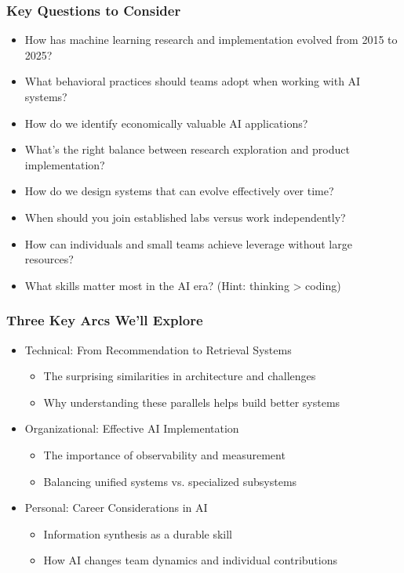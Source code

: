 {    \begin{frame}
        \frametitle{Key Questions to Consider}
        \begin{itemize}
            \item How has machine learning research and implementation evolved from 2015 to 2025?
            \item What behavioral practices should teams adopt when working with AI systems?
            \item How do we identify economically valuable AI applications?
            \item What's the right balance between research exploration and product implementation?
            \item How do we design systems that can evolve effectively over time?
            \item When should you join established labs versus work independently?
            \item How can individuals and small teams achieve leverage without large resources?
            \item What skills matter most in the AI era? (Hint: thinking > coding)
        \end{itemize}
    \end{frame}
    
    \begin{frame}
        \frametitle{Three Key Arcs We'll Explore}
        \begin{itemize}
            \item Technical: From Recommendation to Retrieval Systems
            \begin{itemize}
                \item The surprising similarities in architecture and challenges
                \item Why understanding these parallels helps build better systems
            \end{itemize}
            \item Organizational: Effective AI Implementation
            \begin{itemize}
                \item The importance of observability and measurement
                \item Balancing unified systems vs. specialized subsystems
            \end{itemize}
            \item Personal: Career Considerations in AI
            \begin{itemize}
                \item Information synthesis as a durable skill
                \item How AI changes team dynamics and individual contributions
            \end{itemize}
        \end{itemize}
    \end{frame}
} %